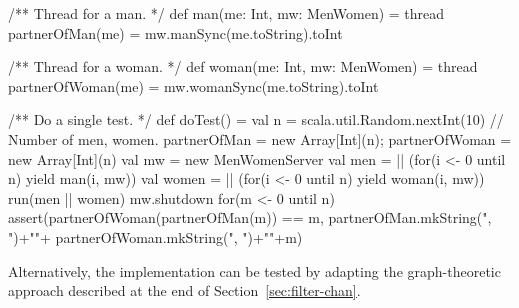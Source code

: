 \begin{answerI}
\begin{scala}
  /** Thread for a man. */
  def man(me: Int, mw: MenWomen) = thread{
    partnerOfMan(me) = mw.manSync(me.toString).toInt
  }

  /** Thread for a woman. */
  def woman(me: Int, mw: MenWomen) = thread{
    partnerOfWoman(me) = mw.womanSync(me.toString).toInt
  }

  /** Do a single test. */
  def doTest() = {
    val n = scala.util.Random.nextInt(10) // Number of men, women.
    partnerOfMan = new Array[Int](n); partnerOfWoman = new Array[Int](n)
    val mw = new MenWomenServer 
    val men = || (for(i <- 0 until n) yield man(i, mw))
    val women = || (for(i <- 0 until n) yield woman(i, mw))
    run(men || women)
    mw.shutdown
    for(m <- 0 until n)
      assert(partnerOfWoman(partnerOfMan(m)) == m,
             partnerOfMan.mkString(", ")+"\n"+
               partnerOfWoman.mkString(", ")+"\n"+m)
  }
\end{scala}

Alternatively, the implementation can be tested by adapting the
graph-theoretic approach described at the end of
Section~\ref{sec:filter-chan}. 
\end{answerI}
% 








